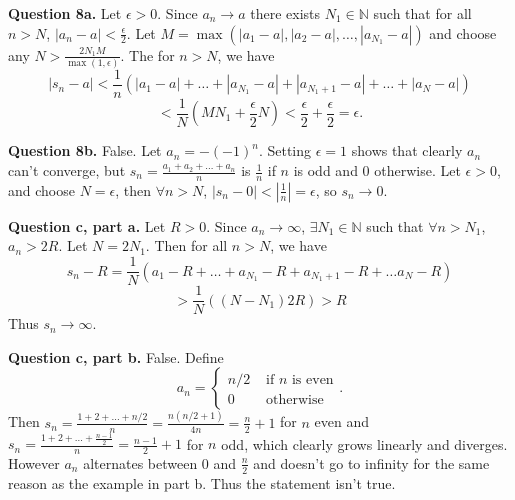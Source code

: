 \documentclass[letterpaper, reqno,11pt]{article}
\begin{document}
\newpage\phantom{blabla}
\newpage

{\medskip\noindent\bf Question 8a.} Let $\epsilon>0$. Since $a_n\to a$ there exists $N_1\in \mathbb{N}$ such that for all $n>N$, $|a_n-a|<\frac{\epsilon}{2}$. Let $M=\max\left( |a_1-a|,|a_2-a|,\ldots,|a_{N_1}-a| \right)$ and choose any $N>\frac{2N_1M}{\max(1,\epsilon)} $. The for $n>N$, we have
\[
|s_n-a|<\frac{1}{n}\left( |a_1-a|+\ldots+|a_{N_1}-a|+|a_{N_1+1}-a|+\ldots+|a_{N}-a| \right)
\]
\[
<\frac{1}{N}\left( MN_1+\frac{\epsilon}{2}N \right)<\frac{\epsilon}{2}+\frac{\epsilon}{2}=\epsilon
.\]

{\medskip\noindent\bf Question 8b.} False. Let $a_n=-(-1)^{n}$. Setting $\epsilon=1$ shows that clearly $a_n$ can't converge, but $s_n=\frac{a_1+a_2+\ldots+a_n}{n}$ is $\frac{1}{n}$ if $n$ is odd and $0$ otherwise. Let $\epsilon>0$, and choose $N=\epsilon$, then $\forall n>N$, $|s_n-0|<|\frac{1}{n}|=\epsilon$, so $s_n\to 0$.

{\medskip\noindent\bf Question c, part a.} Let $R>0$. Since $a_n\to \infty$, $\exists N_1\in \mathbb{N}$ such that $\forall n>N_1$, $a_n>2R$. Let $N=2N_1$. Then for all $n>N$, we have
\[
s_n-R=\frac{1}{N}\left( a_1-R+\ldots+a_{N_1}-R+a_{N_1+1}-R+\ldots a_N-R \right)
\]
\[
>\frac{1}{N}\left( (N-N_1)2R \right) >R
\]
Thus $s_n\to \infty$.

{\medskip\noindent\bf Question c, part b.} False. Define
\[
a_n=\begin{cases}
    n /2&\text{ if }n\text{ is even}\\
    0&\text{ otherwise}
\end{cases}
.\]
Then $s_n=\frac{1+2+\ldots+n /2}{n}=\frac{n(n /2+1)}{4n}=\frac{n}{2}+1$ for $n$ even and $s_n=\frac{1+2+\ldots+\frac{n-1}{2}}{n}=\frac{n-1}{2}+1$ for $n$ odd, which clearly grows linearly and diverges. However $a_n$ alternates between $0$ and $\frac{n}{2}$ and doesn't go to infinity for the same reason as the example in part b. Thus the statement isn't true.

\newpage\phantom{blabla}
\newpage
\end{document}
